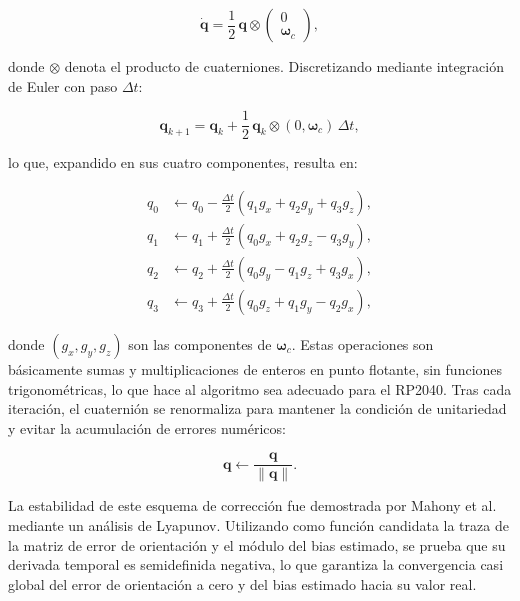 \documentclass[12pt]{article}
\begin{document}
\begin{equation}
\dot{\mathbf{q}} = \frac{1}{2} \, \mathbf{q} \otimes
\begin{pmatrix} 0 \\ \boldsymbol{\omega}_c \end{pmatrix},
\end{equation}

donde $\otimes$ denota el producto de cuaterniones. Discretizando mediante integración de Euler con paso $\Delta t$:

\begin{equation}
\mathbf{q}_{k+1} = \mathbf{q}_k + \frac{1}{2} \, \mathbf{q}_k \otimes
(0, \boldsymbol{\omega}_c) \, \Delta t,
\end{equation}

lo que, expandido en sus cuatro componentes, resulta en:

\begin{equation}
\begin{aligned}
q_0 &\leftarrow q_0 - \tfrac{\Delta t}{2}(q_1 g_x + q_2 g_y + q_3 g_z), \\
q_1 &\leftarrow q_1 + \tfrac{\Delta t}{2}(q_0 g_x + q_2 g_z - q_3 g_y), \\
q_2 &\leftarrow q_2 + \tfrac{\Delta t}{2}(q_0 g_y - q_1 g_z + q_3 g_x), \\
q_3 &\leftarrow q_3 + \tfrac{\Delta t}{2}(q_0 g_z + q_1 g_y - q_2 g_x),
\end{aligned}
\end{equation}

donde $(g_x, g_y, g_z)$ son las componentes de $\boldsymbol{\omega}_c$. Estas operaciones son básicamente sumas y multiplicaciones de enteros en punto flotante, sin funciones trigonométricas, lo que hace al algoritmo sea adecuado para el RP2040. Tras cada iteración, el cuaternión se renormaliza para mantener la condición de unitariedad y evitar la acumulación de errores numéricos:

\begin{equation}
\mathbf{q} \leftarrow \frac{\mathbf{q}}{\|\mathbf{q}\|}.
\end{equation}

La estabilidad de este esquema de corrección fue demostrada por Mahony et al. \cite{Mahony2008} mediante un análisis de Lyapunov. Utilizando como función candidata la traza de la matriz de error de orientación y el módulo del bias estimado, se prueba que su derivada temporal es semidefinida negativa, lo que garantiza la convergencia
casi global del error de orientación a cero y del bias estimado hacia su valor real.
\end{document}
